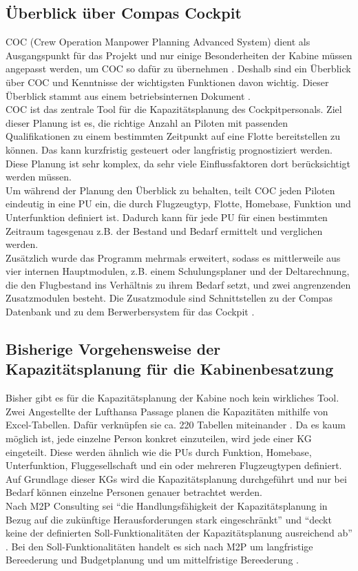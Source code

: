 \documentclass [12pt, a4paper, oneside, titlepage, ngerman]{article}
\begin{document}
\subsection{Überblick über Compas Cockpit}
\ac{COC} (Crew Operation Manpower Planning Advanced System) dient als Ausgangspunkt für das Projekt und nur einige Besonderheiten der Kabine müssen angepasst werden, um \ac{COC} so dafür zu übernehmen \cite[vgl.][]{Gespraech1}. Deshalb sind ein Überblick über \ac{COC} und Kenntnisse der wichtigsten Funktionen davon wichtig. Dieser Überblick stammt aus einem betriebsinternen Dokument \cite[vgl.][]{compasdoku}. \\
\ac{COC} ist das zentrale Tool für die Kapazitätsplanung des Cockpitpersonals. Ziel dieser Planung ist es, die richtige Anzahl an Piloten mit passenden Qualifikationen zu einem bestimmten Zeitpunkt auf eine Flotte bereitstellen zu können. Das kann kurzfristig gesteuert oder langfristig prognostiziert werden. Diese Planung ist sehr komplex, da sehr viele Einflussfaktoren dort berücksichtigt werden müssen. \\
Um während der Planung den Überblick zu behalten, teilt \ac{COC} jeden Piloten eindeutig in eine \ac{PU} ein, die durch Flugzeugtyp, Flotte, Homebase, Funktion und Unterfunktion definiert ist. Dadurch kann für jede \ac{PU} für einen bestimmten Zeitraum tagesgenau z.B. der Bestand und Bedarf ermittelt und verglichen werden. \\
Zusätzlich wurde das Programm mehrmals erweitert, sodass es mittlerweile aus vier internen Hauptmodulen, z.B. einem Schulungsplaner und der Deltarechnung, die den Flugbestand ins Verhältnis zu ihrem Bedarf setzt, und zwei angrenzenden Zusatzmodulen besteht. Die Zusatzmodule sind Schnittstellen zu der Compas Datenbank und zu dem Berwerbersystem für das Cockpit \cite[vgl.][S.19]{compasdoku}.


\subsection{Bisherige Vorgehensweise der Kapazitätsplanung für die Kabinenbesatzung} \label{vorgehensweise}
Bisher gibt es für die Kapazitätsplanung der Kabine noch kein wirkliches Tool. Zwei Angestellte der Lufthansa Passage planen die Kapazitäten mithilfe von Excel-Tabellen. Dafür verknüpfen sie ca. 220 Tabellen miteinander \cite[vgl.][]{Gespraech2}. Da es kaum möglich ist, jede einzelne Person konkret einzuteilen, wird jede einer \ac{KG} eingeteilt. Diese werden ähnlich wie die \acp{PU} durch Funktion, Homebase, Unterfunktion, Fluggesellschaft und ein oder mehreren Flugzeugtypen definiert. Auf Grundlage dieser \acp{KG} wird die Kapazitätsplanung durchgeführt und nur bei Bedarf können einzelne Personen genauer betrachtet werden.  \\
Nach M2P Consulting sei "`die Handlungsfähigkeit der Kapazitätsplanung in Bezug auf die zukünftige Herausforderungen stark eingeschränkt"' \cite[S.5]{M2P} und "`deckt keine der definierten Soll-Funktionalitäten der Kapazitätsplanung ausreichend ab"' \cite[S.6]{M2P}. Bei den Soll-Funktionalitäten handelt es sich nach M2P um langfristige Bereederung und Budgetplanung und um mittelfristige Bereederung \cite[vgl.][S.6]{M2P}.
\end{document}
